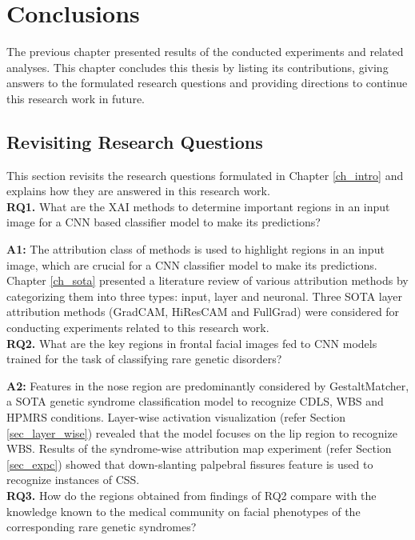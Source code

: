 \documentclass[../report.tex]{subfiles}
\begin{document}
    \chapter{Conclusions}
	The previous chapter presented results of the conducted experiments and related analyses. This chapter concludes this thesis by listing its contributions, giving answers to the formulated research questions and providing directions to continue this research work in future.
	\section{Revisiting Research Questions}
	This section revisits the research questions formulated in Chapter \ref{ch_intro} and explains how they are answered in this research work.\\
	
	
	\textbf{RQ1.} What are the XAI methods to determine important regions in an input image for a CNN based classifier model to make its predictions?
	
	\textbf{A1:} The attribution class of methods is used to highlight regions in an input image, which are crucial for a CNN classifier model to make its predictions. Chapter \ref{ch_sota} presented a literature review of various attribution methods by categorizing them into three types: input, layer and neuronal. Three SOTA layer attribution methods (GradCAM, HiResCAM and FullGrad) were considered for conducting experiments related to this research work.\\
	
	\textbf{RQ2.} What are the key regions in frontal facial images fed to CNN models trained for the task of classifying rare genetic disorders?
	
	\textbf{A2:} Features in the nose region are predominantly considered by GestaltMatcher, a SOTA genetic syndrome classification model to recognize CDLS, WBS and HPMRS conditions. Layer-wise activation visualization (refer Section \ref{sec_layer_wise}) revealed that the model focuses on the lip region to recognize WBS. Results of the syndrome-wise attribution map experiment (refer Section \ref{sec_expc}) showed that down-slanting palpebral fissures feature is used to recognize instances of CSS. \\
	
	
	\textbf{RQ3.} How do the regions obtained from findings of RQ2 compare with the knowledge known to the medical community on facial phenotypes of the corresponding rare genetic syndromes?
\end{document}
